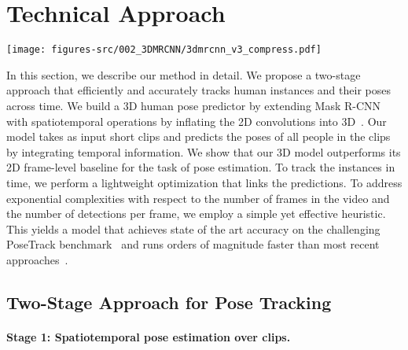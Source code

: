 \documentclass[10pt,twocolumn,letterpaper]{article}
\newcommand{\MODEL}[0]{3D Mask R-CNN}
\begin{document}
\section{Technical Approach}\label{sec:approach}

\begin{figure*}
    \centering
    \texttt{[image: figures-src/002\_3DMRCNN/3dmrcnn\_v3\_compress.pdf]}
    \caption{{\bf Proposed \MODEL{} network architecture:} Our architecture, as described in Sec.~\ref{sec:approach:3dmrcnn}, has 
    three main parts. The base network is a standard ResNet, extended to 3D. It generates a 3D feature blob, which is then used to 
    generate proposal tubes using the Tube Proposal Network (TPN). The tubes are used to extract region features from the 3D feature blob,
    using a spatiotemporal RoIAlign operation, and are fed into heads that classify/regress for a tight tube and another to predict keypoint heatmaps.}
    \label{fig:nwarch}
\end{figure*}

In this section, we describe our method in detail. We propose a two-stage approach that efficiently and accurately tracks human instances and their poses across time. We build a 3D human pose predictor by extending Mask R-CNN~\cite{he2017mask} with spatiotemporal operations by inflating the 2D convolutions into 3D~\cite{carreira2017quo}. Our model takes as input short clips and predicts the poses of all people in the clips by integrating temporal information. We show that our 3D model outperforms its 2D frame-level baseline for the task of pose estimation. To track the instances in time, we perform a lightweight optimization that links the predictions. To address exponential complexities with respect to the number of frames in the video and the number of detections per frame, we employ a simple yet effective heuristic. This yields a model that achieves state of the art accuracy on the challenging PoseTrack benchmark~\cite{PoseTrack} and runs orders of magnitude faster than most recent approaches~\cite{insafutdinov2016articulated,iqbal2016pose}. 



\subsection{Two-Stage Approach for Pose Tracking}

\paragraph{Stage 1: Spatiotemporal pose estimation over clips.}\label{sec:approach:3dmrcnn}
\end{document}
